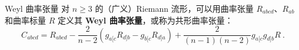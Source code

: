 


\begin{definition}{Weyl 曲率张量}
对 $n \ge 3$ 的（广义）Riemann 流形，可以用曲率张量 $R_{abcd}$、$R_{ab}$ 和曲率标量 $R$ 定义其 \textbf{Weyl 曲率张量}，或称为共形曲率张量：
\begin{equation}
C_{abcd} = R_{abcd} - \frac{2}{n-2} \left(g_{a[c}R_{d]b} - g_{b[c}R_{d]a}\right) + \frac{2}{(n-1)(n-2)} g_{a[c}g_{d]b} R ~.
\end{equation}

\end{definition}